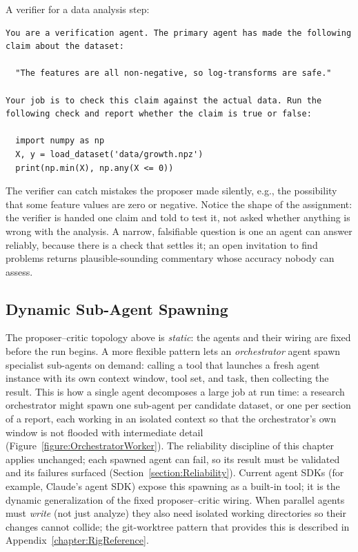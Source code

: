 \begin{example}
A verifier for a data analysis step:
\begin{lstlisting}[language=markdown]
You are a verification agent. The primary agent has made the following
claim about the dataset:

  "The features are all non-negative, so log-transforms are safe."

Your job is to check this claim against the actual data. Run the
following check and report whether the claim is true or false:

  import numpy as np
  X, y = load_dataset('data/growth.npz')
  print(np.min(X), np.any(X <= 0))
\end{lstlisting}
The verifier can catch mistakes the proposer made silently, e.g., the possibility that some feature values are zero or negative.
Notice the shape of the assignment: the verifier is handed one claim and told to test it, not asked whether anything is wrong with the analysis.
A narrow, falsifiable question is one an agent can answer reliably, because there is a check that settles it; an open invitation to find problems returns plausible-sounding commentary whose accuracy nobody can assess.
\end{example}

\subsection{Dynamic Sub-Agent Spawning}

The proposer--critic topology above is \emph{static}: the agents and their wiring are fixed before the run begins.
A more flexible pattern lets an \emph{orchestrator} agent spawn specialist sub-agents on demand: calling a tool that launches a fresh agent instance with its own context window, tool set, and task, then collecting the result.
This is how a single agent decomposes a large job at run time: a research orchestrator might spawn one sub-agent per candidate dataset, or one per section of a report, each working in an isolated context so that the orchestrator's own window is not flooded with intermediate detail (Figure~\ref{figure:OrchestratorWorker}).
The reliability discipline of this chapter applies unchanged; each spawned agent can fail, so its result must be validated and its failures surfaced (Section~\ref{section:Reliability}).
Current agent SDKs (for example, Claude's agent SDK) expose this spawning as a built-in tool; it is the dynamic generalization of the fixed proposer--critic wiring.
When parallel agents must \emph{write} (not just analyze) they also need isolated working directories so their changes cannot collide; the git-worktree pattern that provides this is described in Appendix~\ref{chapter:RigReference}.

